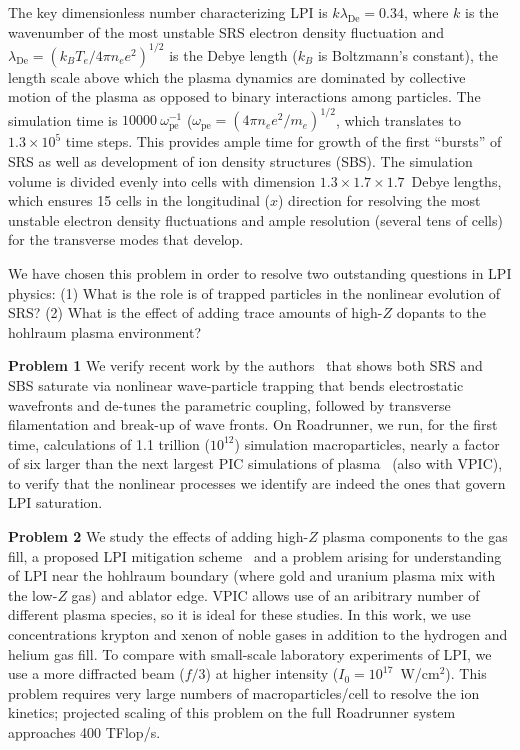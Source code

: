 \documentclass[letter,10pt]{article}
\newcommand{\lde}      {\lambda_{\mathrm{De}}}
\newcommand{\wpe}      {\omega_{\mathrm{pe}}}
\begin{document}
The key dimensionless number characterizing LPI is $k \lde = 0.34$, where $k$ is 
the wavenumber of the most unstable SRS electron density fluctuation and 
$\lde = (k_B T_e / 4 \pi n_e e^2)^{1/2}$ is the Debye length ($k_B$ is Boltzmann's 
constant), the length scale above which 
the plasma dynamics are dominated by collective motion of the plasma as opposed to 
binary interactions among particles.  
The simulation time is $10000~\wpe^{-1}$ ($\wpe = (4 \pi n_e e^2 / m_e)^{1/2}$, which 
translates to $1.3 \times 10^5$ time steps.  This provides ample time for growth of the
first ``bursts'' of SRS as well as development of ion density structures (SBS).  
The simulation volume is divided evenly into cells with dimension 
$1.3 \times 1.7 \times 1.7$~Debye lengths, which ensures 15 cells in the longitudinal 
($x$) direction for resolving the most unstable electron density fluctuations and ample 
resolution (several tens of cells) for the transverse modes that develop.  

We have chosen this problem in order to resolve two outstanding questions in LPI 
physics:  (1) What is the role is of trapped particles in the nonlinear evolution of
SRS?  (2) What is the effect of adding trace amounts of high-$Z$ dopants to the 
hohlraum plasma environment?  

\textbf{Problem 1}
We verify 
recent work by the authors~\cite{} that shows both SRS and SBS saturate via nonlinear 
wave-particle trapping that bends electrostatic wavefronts and de-tunes the parametric 
coupling, followed by transverse filamentation and break-up of wave fronts.  
On Roadrunner, we run, for the first time, calculations of 1.1 trillion ($10^{12}$) 
simulation macroparticles, nearly a factor of six larger than the next largest PIC 
simulations of plasma~\cite{} (also with VPIC), to verify that the nonlinear processes 
we identify are indeed the ones that govern LPI saturation.  

\textbf{Problem 2}
We study the effects of adding high-$Z$ plasma components to the gas fill, a 
proposed LPI mitigation scheme~\cite{} and a problem arising for understanding of 
LPI near the hohlraum boundary (where gold and uranium plasma mix with the low-$Z$ gas) 
and ablator edge.  VPIC allows use of an aribitrary number of different plasma species, 
so it is ideal for these studies.  In this work, we use concentrations krypton and 
xenon of noble gases in addition to the hydrogen and helium gas fill.  To compare 
with small-scale laboratory experiments of LPI, we use a more diffracted beam ($f/3$) 
at higher intensity ($I_0 = 10^{17}$~W/cm$^2$). This problem requires very large numbers
of macroparticles/cell to resolve the ion kinetics; projected scaling of this problem 
on the full Roadrunner system approaches 400 TFlop/s.  
\end{document}
